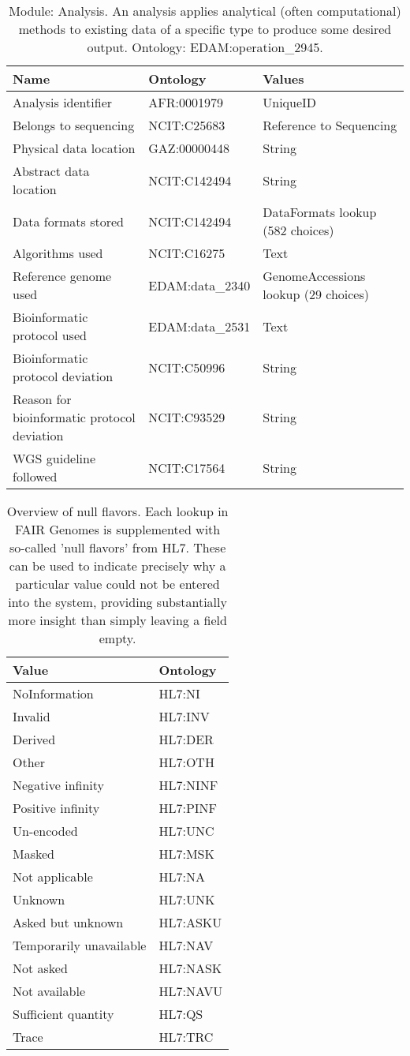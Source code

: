 \documentclass{article}
\begin{document}
\begin{table}[htb]
\begin{tabular}{lll}
Name & Ontology & Values \\
\hline
Analysis identifier & AFR:0001979 & UniqueID \\
Belongs to sequencing & NCIT:C25683 & Reference to Sequencing \\
Physical data location & GAZ:00000448 & String \\
Abstract data location & NCIT:C142494 & String \\
Data formats stored & NCIT:C142494 & DataFormats lookup (582 choices) \\
Algorithms used & NCIT:C16275 & Text \\
Reference genome used & EDAM:data\_2340 & GenomeAccessions lookup (29 choices) \\
Bioinformatic protocol used & EDAM:data\_2531 & Text \\
Bioinformatic protocol deviation & NCIT:C50996 & String \\
Reason for bioinformatic protocol deviation & NCIT:C93529 & String \\
WGS guideline followed & NCIT:C17564 & String \\
\hline
\end{tabular}
\caption[Module: Analysis]{\label{table:table10} Module: Analysis. An analysis applies analytical (often computational) methods to existing data of a specific type to produce some desired output. Ontology: EDAM:operation\_2945. }
\end{table}

\begin{table}[htb]
\begin{tabular}{ll}
Value & Ontology \\
\hline
NoInformation & HL7:NI \\
Invalid & HL7:INV \\
Derived & HL7:DER \\
Other & HL7:OTH \\
Negative infinity & HL7:NINF \\
Positive infinity & HL7:PINF \\
Un-encoded & HL7:UNC \\
Masked & HL7:MSK \\
Not applicable & HL7:NA \\
Unknown & HL7:UNK \\
Asked but unknown & HL7:ASKU \\
Temporarily unavailable & HL7:NAV \\
Not asked & HL7:NASK \\
Not available & HL7:NAVU \\
Sufficient quantity & HL7:QS \\
Trace & HL7:TRC \\
\hline
\end{tabular}
\caption[NullFlavors]{\label{table:table11} Overview of null flavors. Each lookup in FAIR Genomes is supplemented with so-called 'null flavors' from HL7. These can be used to indicate precisely why a particular value could not be entered into the system, providing substantially more insight than simply leaving a field empty. }
\end{table}
\end{document}
